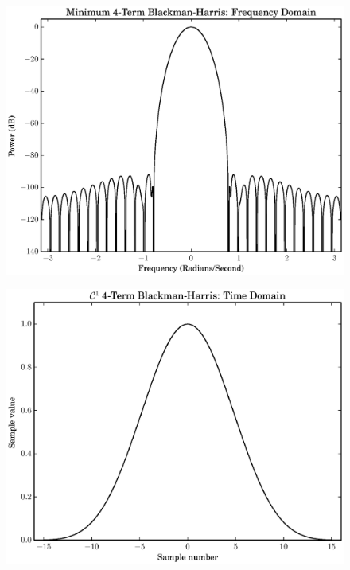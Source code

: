 \begin{figure}[!t]
    \caption{}
    \includegraphics[width=\textwidth]{plots/min4_blackman_fd.eps}
\end{figure}

\begin{figure}[!t]
    \caption{}
    \includegraphics[width=\textwidth]{plots/c1_blackman_td.eps}
\end{figure}


